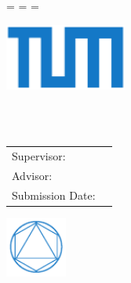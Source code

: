 \begin{titlepage}
  \oddsidemargin=\evensidemargin\relax
  \textwidth=\dimexpr{}\evensidemargin-2in\relax
  \hsize=\textwidth\relax

  \centering

  \includegraphics[width=40mm]{pages/tum}

  \vspace{5mm}
  {\LARGE\MakeUppercase{\getFacultyTUM{}}}\\

  \vspace{5mm}
  {\large\MakeUppercase{\getUniversityTUM{}}}\\

  \vspace{15mm}
  {\Large \getDoctypeTUM{}}

  \vspace{10mm}
  {\huge\bfseries \getTitle{}\par}

  \vspace{15mm}
  {\LARGE\getAuthor{}}

  \vspace{15mm}
  \begin{tabular}{l l}
    Supervisor: & \getSupervisorTUM{} \\
    Advisor: & \getAdvisorTUM{} \\
    Submission Date: & \getSubmissionDate{} \\
  \end{tabular}

  \vspace{10mm}
  \includegraphics[width=20mm]{pages/faculty}
\end{titlepage}
